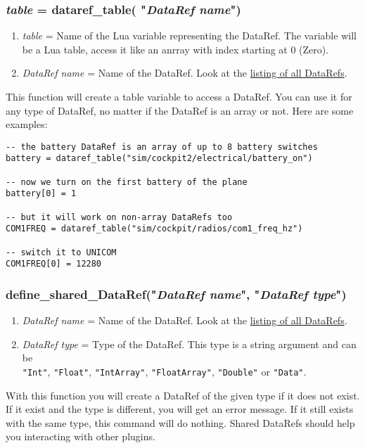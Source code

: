 \documentclass[11pt,parskip=half,a4paper]{scrartcl}
\begin{document}
\subsubsection{\emph{table} = dataref\_table( "\emph{DataRef name}")}

\begin{enumerate}
	\item \emph{table} = Name of the Lua variable representing the DataRef. The variable will be a Lua table, access it like an anrray with index starting at 0 (Zero). 
	\item \emph{DataRef name} = Name of the DataRef. Look at the \href{http://www.xsquawkbox.net/xpsdk/docs/DataRefs.html}{listing of all DataRefs}.
\end{enumerate}

This function will create a table variable to access a DataRef. You can use it for any type of DataRef, no matter if the DataRef is an array or not. Here are some examples:

\begin{lstlisting}
-- the battery DataRef is an array of up to 8 battery switches
battery = dataref_table("sim/cockpit2/electrical/battery_on")

-- now we turn on the first battery of the plane
battery[0] = 1

-- but it will work on non-array DataRefs too
COM1FREQ = dataref_table("sim/cockpit/radios/com1_freq_hz")

-- switch it to UNICOM
COM1FREQ[0] = 12280
\end{lstlisting}

\subsubsection{define\_shared\_DataRef("\emph{DataRef name}", "\emph{DataRef type}")}

\begin{enumerate}
	\item \emph{DataRef name} = Name of the DataRef. Look at the \href{http://www.xsquawkbox.net/xpsdk/docs/DataRefs.html}{listing of all DataRefs}.
	\item \emph{DataRef type} = Type of the DataRef. This type is a string argument and can be\\ \verb|"Int"|, \verb|"Float"|, \verb|"IntArray"|, \verb|"FloatArray"|, \verb|"Double"| or \verb|"Data"|.
\end{enumerate}

With this function you will create a DataRef of the given type if it does not exist. If it exist and the type is different, you will get an error message. If it still exists with the same type, this command will do nothing. Shared DataRefs should help you interacting with other plugins.
\end{document}
